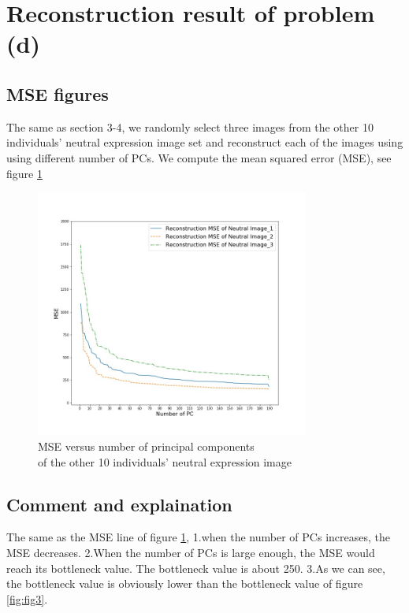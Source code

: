 \documentclass{article}
\begin{document}
\section{Reconstruction result of problem (d)}

\subsection{MSE figures}
The same as section 3-4, we randomly select three images from the other 10 individuals’ neutral expression image set
and reconstruct each of the images using using different number of PCs. We compute the mean squared error (MSE), see figure
\ref{fig:fig4}
\begin{figure}[h]
  \centering
  \includegraphics[width=0.8\textwidth]{../image/mse_other_neutral.jpg}
  \caption{MSE versus number of principal components\\ of the other 10 individuals’ neutral expression image}
  \label{fig:fig4}
\end{figure}

\subsection{Comment and explaination}
The same as the MSE line of figure \ref{fig:fig4}, 1.when the number of PCs increases, the MSE decreases. 2.When
the number of PCs is large enough, the MSE would reach its bottleneck value. The bottleneck value is about 250.
3.As we can see, the bottleneck value is obviously lower than the bottleneck value of figure \ref{fig:fig3}.\\
\end{document}
